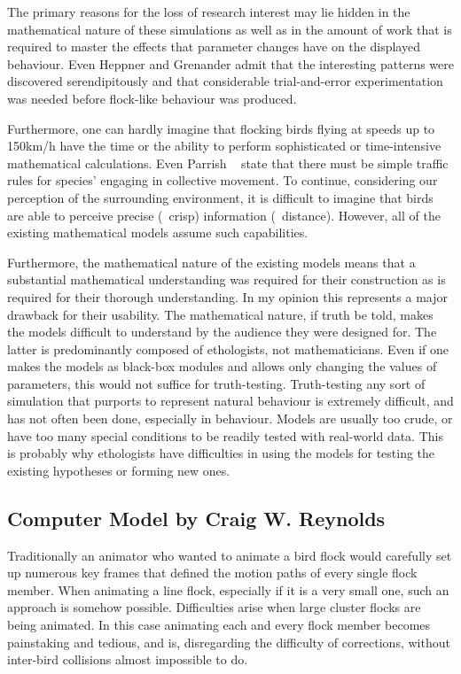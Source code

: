 The primary reasons for the loss of research interest may lie hidden in the mathematical nature of these simulations as well as in the amount of work that is required to master the effects that parameter changes have on the displayed behaviour. Even Heppner and Grenander \cite{heppner:1990} admit that the interesting patterns were discovered serendipitously and that considerable trial-and-error experimentation was needed before flock-like behaviour was produced.

Furthermore, one can hardly imagine that flocking birds flying at speeds up to 150km/h \cite{heppner:1997} have the time or the ability to perform sophisticated or time-intensive mathematical calculations. Even Parrish \etal\ \cite{parrish:1997a} state that there must be simple traffic rules for species' engaging in collective movement. To continue, considering our perception of the surrounding environment, it is difficult to imagine that birds are able to perceive precise (\ie\ crisp) information (\eg\ distance). However, all of the existing mathematical models assume such capabilities.

Furthermore, the mathematical nature of the existing models means that a substantial mathematical understanding was required for their construction as is required for their thorough understanding. In my opinion this represents a major drawback for their usability. The mathematical nature, if truth be told, makes the models difficult to understand by the audience they were designed for. The latter is predominantly composed of ethologists, not mathematicians. Even if one makes the models as black-box modules and allows only changing the values of parameters, this would not suffice for truth-testing. Truth-testing any sort of simulation that purports to represent natural behaviour is extremely difficult, and has not often been done, especially in behaviour. Models are usually too crude, or have too many special conditions to be readily tested with real-world data. This is probably why ethologists have difficulties in using the models for testing the existing hypotheses or forming new ones.

\subsection{Computer Model by Craig W. Reynolds}
\label{sec:birdFlocks:cwr}
Traditionally an animator who wanted to animate a bird flock would carefully set up numerous key frames that defined the motion paths of every single flock member. When animating a line flock, especially if it is a very small one, such an approach is somehow possible. Difficulties arise when large cluster flocks are being animated. In this case animating each and every flock member becomes painstaking and tedious, and is, disregarding the difficulty of corrections, without inter-bird collisions almost impossible to do. 

